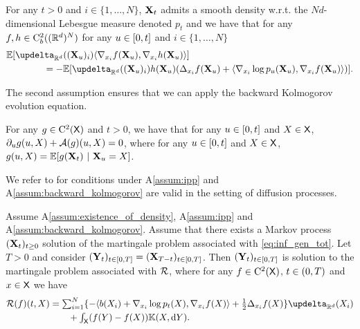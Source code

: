 \begin{assumption}
  \label{assum:ipp}
  For any $t > 0$ and $i \in \{1, \dots, N\}$, $\mathbf{X}_t$ admits a smooth
  density w.r.t. the $Nd$-dimensional Lebesgue measure denoted $p_t$ and we have that for any
  $f, h \in \mathrm{C}_b^2((\mathbb{R}^d)^N)$
for any $u \in [ 0,t ]$ and $i \in \{1, \dots, N\}$
    \begin{align}
      &\expeLigne{\updelta_{\rset^d}((\bfX_u)_i) \langle \nabla_{x_i} f(\bfX_u), \nabla_{x_i} h( \bfX_u) \rangle} \\
      & \qquad \qquad = -  \expeLigne{\updelta_{\rset^d}((\bfX_u)_i) h(\bfX_u) (\Delta_{x_i} f(\bfX_u) + \langle \nabla_{x_i} \log p_u(\bfX_u), \nabla_{x_i} f(\bfX_u) \rangle)} .
    \end{align}  
\end{assumption}

The second assumption ensures that we can apply the backward Kolmogorov
evolution equation.

\begin{assumption}
  \label{assum:backward_kolmogorov}
  For any $g \in \mathrm{C}^2(\mathsf{X})$ and $t > 0$, we have that for any $u \in [ 0,t ]$ and
  $X \in \mathsf{X}$, $\partial_u g(u,X) + \mathcal{A}(g)(u,X) = 0$, where for any
  $u \in [ 0,t ]$ and $X \in \mathsf{X}$,
  $g(u,X) = \mathbb{E}[g(\mathbf{X}_t) \ | \ \mathbf{X}_u=X]$.
\end{assumption}

We refer to \cite{haussmann1986time} for conditions under A\ref{assum:ipp} and
A\ref{assum:backward_kolmogorov} are valid in the setting of diffusion processes.

  \begin{proposition}
    \label{prop:time_reversal_kill}
    Assume \textup{A\ref{assum:existence_of_density}}, \textup{A\ref{assum:ipp}}
    and \textup{A\ref{assum:backward_kolmogorov}}. Assume that there exists a
    Markov process $(\mathbf{X}_t)_{t \geq 0}$ solution of the martingale problem
    associated with \eqref{eq:inf_gen_tot}. Let $T > 0$ and consider
    $(\mathbf{Y}_t)_{t \in [ 0,T ]} = (\mathbf{X}_{T-t})_{t \in [ 0,T ]}$. Then
    $(\mathbf{Y}_t)_{t \in [ 0,T ]}$ is solution to the martingale problem
    associated with $\mathcal{R}$, where for any $f \in \mathrm{C}^2(\mathsf{X})$,
    $t \in ( 0,T )$ and $x \in \mathsf{X}$ we have
\begin{align}
  \label{eq:inf_gen_tot_rev}
  \calR(f)(t, X) &\textstyle= \sum_{i=1}^N \{ -\langle b(X_i)+\nabla_{x_i} \log p_t(X), \nabla_{x_i}f(X) \rangle + \tfrac{1}{2} \Delta_{x_i}f(X)\} \updelta_{\rset^d}(X_i) \\
  & \qquad  \textstyle + \int_{\msx}(f(Y) - f(X))\Kbb(X, \rmd Y) .
\end{align}
  \end{proposition}

